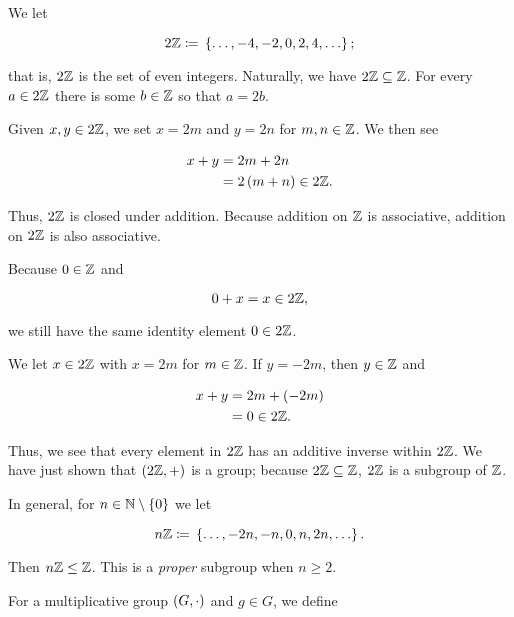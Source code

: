 \begin{example}
We let

\begin{equation}
    2\mathbb{Z} \coloneqq{} \left\{ \ldots, -4, -2, 0, 2, 4, \ldots \right\};
\end{equation}

\noindent
that is, $2\mathbb{Z}$ is the set of even integers.
Naturally, we have $2\mathbb{Z}\subseteq\mathbb{Z}$.
For every $a\in2\mathbb{Z}$ there is some $b\in\mathbb{Z}$ so that $a = 2b$.

Given $x,y\in2\mathbb{Z}$, we set $x = 2m$ and $y = 2n$ for $m,n\in\mathbb{Z}$.
We then see

\begin{align}
    x + y &= 2m + 2n \nonumber\\
        &= 2\left( m+n \right)\in2\mathbb{Z}.
\end{align}

\noindent
Thus, $2\mathbb{Z}$ is closed under addition.
Because addition on $\mathbb{Z}$ is \gls{associative},
addition on $2\mathbb{Z}$ is also \gls{associative}.

Because $0\in\mathbb{Z}$ and

\begin{equation}
    0 + x = x\in2\mathbb{Z},
\end{equation}

\noindent
we still have the same identity element $0\in2\mathbb{Z}$.

We let $x\in2\mathbb{Z}$ with $x = 2m$ for $m\in\mathbb{Z}$.
If $y = -2m$, then $y\in\mathbb{Z}$ and

\begin{align}
    x + y &= 2m + \left( -2m \right) \nonumber\\
        &= 0\in2\mathbb{Z}.
\end{align}

\noindent
Thus, we see that every element in $2\mathbb{Z}$ has an additive inverse
within $2\mathbb{Z}$.
We have just shown that $\left( 2\mathbb{Z},+ \right)$ is a \gls{group};
because $2\mathbb{Z}\subseteq\mathbb{Z}$, $2\mathbb{Z}$ is a \gls{subgroup} of $\mathbb{Z}$.

In general, for $n\in\mathbb{N}\setminus\left\{ 0 \right\}$ we let

\begin{equation}
    n\mathbb{Z} \coloneqq{} \left\{ \ldots, -2n, -n, 0, n, 2n, \ldots \right\}.
\end{equation}

\noindent
Then $n\mathbb{Z}\le\mathbb{Z}$.
This is a \emph{proper} subgroup when $n\ge2$.
\end{example}

For a multiplicative group $\left( G,\cdot \right)$ and $g\in G$, we define

